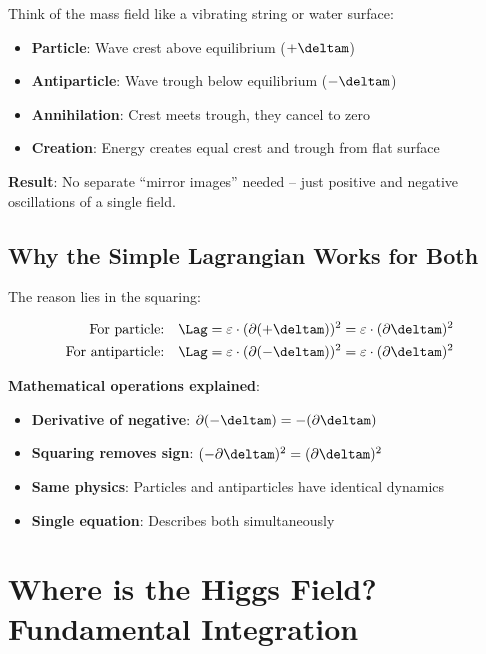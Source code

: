 	\begin{tcolorbox}[colback=green!5!white,colframe=green!75!black,title=Intuitive Antiparticle Picture]
		Think of the mass field like a vibrating string or water surface:
		\begin{itemize}
			\item \textbf{Particle}: Wave crest above equilibrium ($+\deltam$)
			\item \textbf{Antiparticle}: Wave trough below equilibrium ($-\deltam$)
			\item \textbf{Annihilation}: Crest meets trough, they cancel to zero
			\item \textbf{Creation}: Energy creates equal crest and trough from flat surface
		\end{itemize}
		
		\textbf{Result}: No separate ``mirror images'' needed -- just positive and negative oscillations of a single field.
	\end{tcolorbox}
	
	\subsection{Why the Simple Lagrangian Works for Both}
	
	The reason lies in the squaring:
	
	\begin{align}
		\text{For particle:} \quad \Lag &= \varepsilon \cdot (\partial (+\deltam))^2 = \varepsilon \cdot (\partial \deltam)^2 \\
		\text{For antiparticle:} \quad \Lag &= \varepsilon \cdot (\partial (-\deltam))^2 = \varepsilon \cdot (\partial \deltam)^2
	\end{align}
	
	\textbf{Mathematical operations explained}:
	\begin{itemize}
		\item \textbf{Derivative of negative}: $\partial(-\deltam) = -(\partial\deltam)$
		\item \textbf{Squaring removes sign}: $(-\partial\deltam)^2 = (\partial\deltam)^2$
		\item \textbf{Same physics}: Particles and antiparticles have identical dynamics
		\item \textbf{Single equation}: Describes both simultaneously
	\end{itemize}
	
	\section{Where is the Higgs Field? Fundamental Integration}
	
